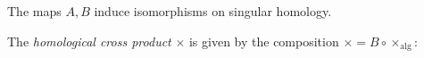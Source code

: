 \begin{theorem}
  The maps $A, B$ induce isomorphisms on
  singular homology.
\end{theorem}

\begin{definition}
  The \emph{homological cross product}
  $\times$ is given by the composition
  $\times = B \circ \times_{\mathrm{alg}}$:
  \begin{center}
  \end{center}
\end{definition}
